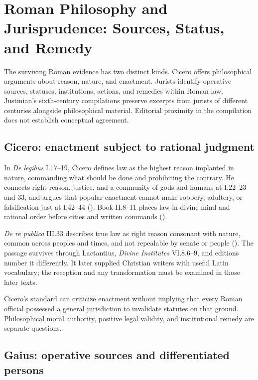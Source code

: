 \section{Roman Philosophy and Jurisprudence: Sources, Status, and Remedy}

The surviving Roman evidence has two distinct kinds. Cicero offers philosophical arguments about reason, nature, and enactment. Jurists identify operative sources, statuses, institutions, actions, and remedies within Roman law. Justinian's sixth-century compilations preserve excerpts from jurists of different centuries alongside philosophical material. Editorial proximity in the compilation does not establish conceptual agreement.

\subsection{Cicero: enactment subject to rational judgment}

In \emph{De legibus} I.17--19, Cicero defines law as the highest reason implanted in nature, commanding what should be done and prohibiting the contrary. He connects right reason, justice, and a community of gods and humans at I.22--23 and 33, and argues that popular enactment cannot make robbery, adultery, or falsification just at I.42--44 (). Book II.8--11 places law in divine mind and rational order before cities and written commands ().

\emph{De re publica} III.33 describes true law as right reason consonant with nature, common across peoples and times, and not repealable by senate or people (). The passage survives through Lactantius, \emph{Divine Institutes} VI.8.6--9, and editions number it differently. It later supplied Christian writers with useful Latin vocabulary; the reception and any transformation must be examined in those later texts.

Cicero's standard can criticize enactment without implying that every Roman official possessed a general jurisdiction to invalidate statutes on that ground. Philosophical moral authority, positive legal validity, and institutional remedy are separate questions.

\subsection{Gaius: operative sources and differentiated persons}

